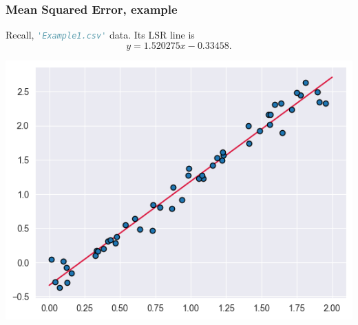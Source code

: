 \documentclass{beamer}
\theoremstyle{example}
\begin{document}
\begin{frame}
    \frametitle{Mean Squared Error, example}
    Recall, \lstinline[language=Python, stringstyle=\ttfamily\color{strings}]{'Example1.csv'} data. Its LSR line is 
        \[y = 1.520275x - 0.33458.\]

    \vfill
    \centering
    \includegraphics[height=0.35\textheight]{./Lecture04-LinearRegression_1/source/example1-lsrline.png}
\end{frame}
\end{document}
